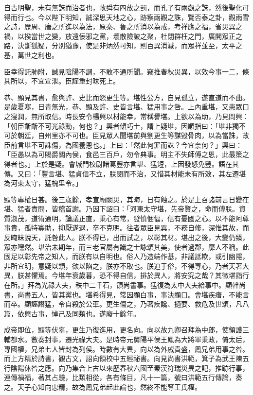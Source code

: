 \begin{pinyinscope}
自古明聖，未有無誅而治者也，故舜有四放之罰，而孔子有兩觀之誅，然後聖化可得而行也。今以陛下明知，誠深思天地之心，跡察兩觀之誅，覽否泰之卦，觀雨雪之詩，歷周、唐之所進以為法，原秦、魯之所消以為戒，考祥應之福，省災異之禍，以揆當世之變，放遠佞邪之黨，壞散險詖之聚，杜閉群枉之門，廣開眾正之路，決斷狐疑，分別猶豫，使是非炳然可知，則百異消滅，而眾祥並至，太平之基，萬世之利也。

臣幸得託肺附，誠見陰陽不調，不敢不通所聞。竊推春秋災異，以效今事一二，條其所以，不宜宣泄。臣謹重封昧死上。

恭、顯見其書，愈與許、史比而怨更生等。堪性公方，自見孤立，遂直道而不曲。是歲夏寒，日青無光，恭、顯及許、史皆言堪、猛用事之咎。上內重堪，又患眾口之寖潤，無所取信。時長安令楊興以材能幸，常稱譽堪。上欲以為助，乃見問興：「朝臣齗齗不可光祿勳，何也？」興者傾巧士，謂上疑堪，因順指曰：「堪非獨不可於朝廷，自州里亦不可也。臣見眾人聞堪前與劉更生等謀毀骨肉，以為當誅，故臣前言堪不可誅傷，為國養恩也。」上曰：「然此何罪而誅？今宜奈何？」興曰：「臣愚以為可賜爵關內侯，食邑三百戶，勿令典事。明主不失師傅之恩，此最策之得者也。」上於是疑。會城門校尉諸葛豐亦言堪、猛短，上因發怒免豐。語在其傳。又曰：「豐言堪、猛貞信不立，朕閔而不治，又惜其材能未有所效，其左遷堪為河東太守，猛槐里令。」

顯等專權日甚。後三歲餘，孝宣廟闕災，其晦，日有蝕之。於是上召諸前言日變在堪、猛者責問，皆稽首謝。乃因下詔曰：「河東太守堪，先帝賢之，命而傅朕。資質淑茂，道術通明，論議正直，秉心有常，發憤悃愊，信有憂國之心。以不能阿尊事貴，孤特寡助，抑厭遂退，卒不克明。往者眾臣見異，不務自修，深惟其故，而反晻昧說天，託咎此人。朕不得已，出而試之，以彰其材。堪出之後，大變仍臻，眾亦嘿然。堪治未期年，而三老官屬有識之士詠頌其美，使者過郡，靡人不稱。此固足以彰先帝之知人，而朕有以自明也。俗人乃造端作基，非議詆欺，或引幽隱，非所宜明，意疑以類，欲以陷之，朕亦不取也。朕迫于俗，不得專心，乃者天著大異，朕甚懼焉。今堪年衰歲暮，恐不得自信，排於異人，將安究之哉？其徵堪詣行在所。」拜為光祿大夫，秩中二千石，領尚書事。猛復為太中大夫給事中。顯幹尚書，尚書五人，皆其黨也。堪希得見，常因顯白事，事決顯口。會堪疾瘖，不能言而卒。顯誣譖猛，令自殺於公車。更生傷之，乃著疾讒、擿要、救危及世頌，凡八篇，依興古事，悼己及同類也。遂廢十餘年。

成帝即位，顯等伏辜，更生乃復進用，更名向。向以故九卿召拜為中郎，使領護三輔都水。數奏封事，遷光祿大夫。是時帝元舅陽平侯王鳳為大將軍秉政，倚太后，專國權，兄弟七人皆封為列侯。時數有大異，向以為外戚貴盛，鳳兄弟用事之咎。而上方精於詩書，觀古文，詔向領校中五經祕書。向見尚書洪範，箕子為武王陳五行陰陽休咎之應。向乃集合上古以來歷春秋六國至秦漢符瑞災異之記，推跡行事，連傳禍福，著其占驗，比類相從，各有條目，凡十一篇，號曰洪範五行傳論，奏之。天子心知向忠精，故為鳳兄弟起此論也，然終不能奪王氏權。


\end{pinyinscope}
